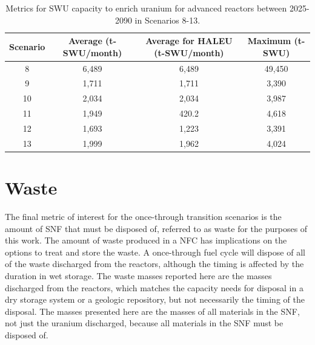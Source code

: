 \begin{table}
    \centering 
    \caption{Metrics for \gls{SWU} capacity to enrich uranium for 
    advanced reactors between 2025-2090 in Scenarios 8-13.}
    \label{tab:1percent_swu}
    \begin{tabular}{c c c c}
        \hline
        Scenario & Average (t-SWU/month) & Average  
        for \gls{HALEU} (t-SWU/month) & Maximum (t-SWU)\\\hline
        8 & 6,489 & 6,489 & 49,450 \\
        9 & 1,711 & 1,711 & 3,390 \\
        10 & 2,034 & 2,034 & 3,987\\
        11 & 1,949 & 420.2 & 4,618 \\
        12 & 1,693 & 1,223 & 3,391\\
        13 & 1,999 & 1,962 & 4,024\\
        \hline
    \end{tabular}
\end{table}

\section{Waste}
The final metric of interest for the once-through transition scenarios is 
the amount of \gls{SNF} that must be disposed of, referred to as waste 
for the purposes of this work. 
The amount of waste produced in a \gls{NFC} has implications on the options 
to treat and store the waste. A once-through fuel cycle will dispose of 
all of the 
waste discharged from the reactors, although 
the timing is affected by the duration in wet storage. The waste masses 
reported here are the masses discharged from the reactors, which 
matches the capacity needs for disposal in a dry storage system or a 
geologic repository, but not necessarily the timing of the disposal.
The masses 
presented here are the masses of all materials in the \gls{SNF}, not just 
the uranium discharged, because all materials in the \gls{SNF} must be 
disposed of. 

